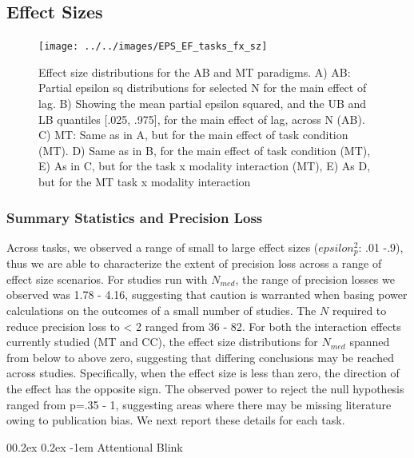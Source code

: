 \documentclass[
  man]{apa6}
\makeatletter
\let\oldparagraph\paragraph
\renewcommand{\paragraph}[1]{\oldparagraph{#1}\mbox{}}
\renewcommand{\paragraph}{\@startsection{paragraph}{4}{\parindent}%
  {0\baselineskip \@plus 0.2ex \@minus 0.2ex}%
  {-1em}%
  {\normalfont\normalsize\bfseries\itshape\typesectitle}}
\makeatother
\begin{document}
\hypertarget{effect-sizes-1}{%
\subsection{Effect Sizes}\label{effect-sizes-1}}

\begin{figure}

{\centering \texttt{[image: ../../images/EPS\_EF\_tasks\_fx\_sz]} 

}

\caption{Effect size distributions for the AB and MT paradigms. A) AB: Partial epsilon sq distributions for selected N for the main effect of lag. B) Showing the mean partial epsilon squared, and the UB and LB quantiles [.025, .975], for the main effect of lag, across N (AB). C) MT: Same as in A, but for the main effect of task condition (MT). D) Same as in B, for the main effect of task condition (MT), E) As in C, but for the task x modality interaction (MT), E) As D, but for the MT task x modality interaction}\label{fig:attEFfx}
\end{figure}

\hypertarget{summary-statistics-and-precision-loss}{%
\subsubsection{Summary Statistics and Precision Loss}\label{summary-statistics-and-precision-loss}}

Across tasks, we observed a range of small to large effect sizes (\(epsilon_{p}^2\): .01 -.9), thus we are able to characterize the extent of precision loss across a range of effect size scenarios. For studies run with \(N_{med}\), the range of precision losses we observed was 1.78 - 4.16, suggesting that caution is warranted when basing power calculations on the outcomes of a small number of studies. The \(N\) required to reduce precision loss to \textless{} 2 ranged from 36 - 82. For both the interaction effects currently studied (MT and CC), the effect size distributions for \(N_{med}\) spanned from below to above zero, suggesting that differing conclusions may be reached across studies. Specifically, when the effect size is less than zero, the direction of the effect has the opposite sign. The observed power to reject the null hypothesis ranged from p=.35 - 1, suggesting areas where there may be missing literature owing to publication bias. We next report these details for each task.

\hypertarget{attentional-blink-2}{%
\paragraph{Attentional Blink}\label{attentional-blink-2}}
\end{document}
